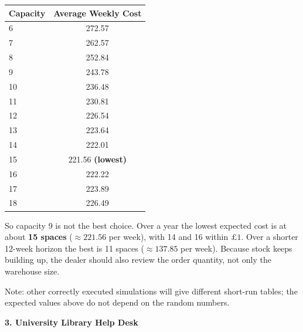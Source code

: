 \documentclass[11pt,a4paper]{article}
\begin{document}
\begin{enumerate}
\begin{center}
\begin{tabular}{lc}
\toprule
Capacity & Average Weekly Cost \\
\midrule
6 & 272.57 \\
7 & 262.57 \\
8 & 252.84 \\
9 & 243.78 \\
10 & 236.48 \\
11 & 230.81 \\
12 & 226.54 \\
13 & 223.64 \\
14 & 222.01 \\
15 & 221.56 \textbf{(lowest)} \\
16 & 222.22 \\
17 & 223.89 \\
18 & 226.49 \\
\bottomrule
\end{tabular}
\end{center}

So capacity 9 is not the best choice. Over a year the lowest expected cost is at about \textbf{15 spaces} ($\approx 221.56$ per week), with 14 and 16 within $\pounds 1$. Over a shorter 12-week horizon the best is 11 spaces ($\approx 137.85$ per week). Because stock keeps building up, the dealer should also review the order quantity, not only the warehouse size.

Note: other correctly executed simulations will give different short-run tables; the expected values above do not depend on the random numbers.
\end{enumerate}

\newpage

\textbf{3. University Library Help Desk}
\end{document}
